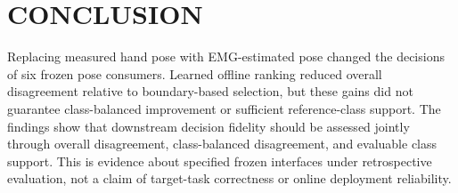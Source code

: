 \documentclass[conference,letterpaper]{IEEEtran}
\begin{document}
\section{CONCLUSION}\label{conclusion}
Replacing measured hand pose with EMG-estimated pose changed the decisions of six frozen pose consumers. Learned offline ranking reduced overall disagreement relative to boundary-based selection, but these gains did not guarantee class-balanced improvement or sufficient reference-class support. The findings show that downstream decision fidelity should be assessed jointly through overall disagreement, class-balanced disagreement, and evaluable class support. This is evidence about specified frozen interfaces under retrospective evaluation, not a claim of target-task correctness or online deployment reliability.

\end{document}
